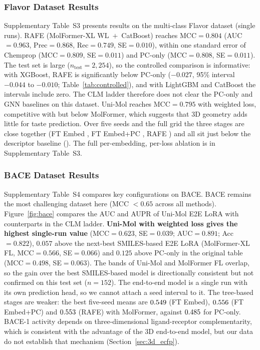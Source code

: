 \documentclass[pdflatex,sn-basic]{sn-jnl}%
\begin{document}
\subsubsection{Flavor Dataset Results}
Supplementary Table~S3 presents results on the multi-class Flavor dataset (single runs). RAFE (MolFormer-XL WL~$+$~CatBoost) reaches MCC$=0.804$ (AUC$=0.963$, Prec$=0.868$, Rec$=0.749$, SE$=0.010$), within one standard error of Chemprop (MCC$=0.809$, SE$=0.011$) and PC-only (MCC$=0.808$, SE$=0.011$). The test set is large ($n_\text{test}=2{,}254$), so the controlled comparison is informative: with XGBoost, RAFE is significantly below PC-only ($-0.027$, 95\% interval $-0.044$ to $-0.010$; Table~\ref{tab:controlled}), and with LightGBM and CatBoost the intervals include zero. The CLM ladder therefore does not clear the PC-only and GNN baselines on this dataset. Uni-Mol reaches MCC$=0.795$ with weighted loss, competitive with but below MolFormer, which suggests that 3D geometry adds little for taste prediction. Over five seeds and the full grid the three stages are close together (FT Embed \mFLAVFT{}, FT Embed+PC \mFLAVFTPC{}, RAFE \mFLAVRAFE{}) and all sit just below the descriptor baseline (\mFLAVPC{}). The full per-embedding, per-loss ablation is in Supplementary Table~S3.

\FloatBarrier
\subsubsection{BACE Dataset Results}
Supplementary Table~S4 compares key configurations on BACE. BACE remains the most challenging dataset here (MCC $< 0.65$ across all methods). Figure~\ref{fig:bace} compares the AUC and AUPR of Uni-Mol E2E LoRA with counterparts in the CLM ladder. \textbf{Uni-Mol with weighted loss gives the highest single-run value} (MCC$=0.623$, SE$=0.039$; AUC$=0.891$; Acc$=0.822$), $0.057$ above the next-best SMILES-based E2E LoRA (MolFormer-XL FL, MCC$=0.566$, SE$=0.066$) and $0.125$ above PC-only in the original table (MCC$=0.498$, SE$=0.063$). The bands of Uni-Mol and MolFormer FL overlap, so the gain over the best SMILES-based model is directionally consistent but not confirmed on this test set ($n=152$). The end-to-end model is a single run with its own prediction head, so we cannot attach a seed interval to it. The tree-based stages are weaker: the best five-seed means are $0.549$ (FT Embed), $0.556$ (FT Embed+PC) and $0.553$ (RAFE) with MolFormer, against $0.485$ for PC-only. BACE-1 activity depends on three-dimensional ligand-receptor complementarity, which is consistent with the advantage of the 3D end-to-end model, but our data do not establish that mechanism (Section~\ref{sec:3d_ecfp}).
\end{document}
